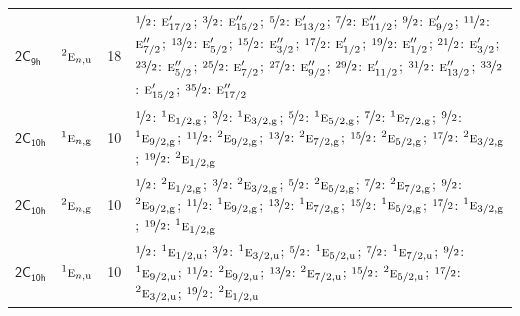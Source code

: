 \documentclass[10pt,a4paper]{article}
\numberwithin{equation}{section}
\newcommand{\grp}[1]{\mathsf{#1}}
\newcommand{\irr}[1]{\text{\normalfont\scshape #1}}
\newcommand{\conjpair}[1]{{}^{#1}}
\newcommand{\ptag}[1]{\mathrm{#1}}
\newlength{\fillwidth}\newlength{\cellwidth}\newlength{\colwidth}
\begin{document}
{\begin{longtable}{@{}llr>{\RaggedRight\arraybackslash}p{\fillwidth}@{}}
\href{2C9h.pdf}{$\grp{2C_{9h}}$} & $\conjpair{2}\irr{e}_{n,\ptag{u}}$ & 18 & $\nicefrac{1}{2}$: $\irr{e}_{17/2}'$; $\nicefrac{3}{2}$: $\irr{e}_{15/2}''$; $\nicefrac{5}{2}$: $\irr{e}_{13/2}'$; $\nicefrac{7}{2}$: $\irr{e}_{11/2}''$; $\nicefrac{9}{2}$: $\irr{e}_{9/2}'$; $\nicefrac{11}{2}$: $\irr{e}_{7/2}''$; $\nicefrac{13}{2}$: $\irr{e}_{5/2}'$; $\nicefrac{15}{2}$: $\irr{e}_{3/2}''$; $\nicefrac{17}{2}$: $\irr{e}_{1/2}'$; $\nicefrac{19}{2}$: $\irr{e}_{1/2}''$; $\nicefrac{21}{2}$: $\irr{e}_{3/2}'$; $\nicefrac{23}{2}$: $\irr{e}_{5/2}''$; $\nicefrac{25}{2}$: $\irr{e}_{7/2}'$; $\nicefrac{27}{2}$: $\irr{e}_{9/2}''$; $\nicefrac{29}{2}$: $\irr{e}_{11/2}'$; $\nicefrac{31}{2}$: $\irr{e}_{13/2}''$; $\nicefrac{33}{2}$: $\irr{e}_{15/2}'$; $\nicefrac{35}{2}$: $\irr{e}_{17/2}''$\\
\href{2C10h.pdf}{$\grp{2C_{10h}}$} & $\conjpair{1}\irr{e}_{n,\ptag{g}}$ & 10 & $\nicefrac{1}{2}$: $\conjpair{1}\irr{e}_{1/2,\ptag{g}}$; $\nicefrac{3}{2}$: $\conjpair{1}\irr{e}_{3/2,\ptag{g}}$; $\nicefrac{5}{2}$: $\conjpair{1}\irr{e}_{5/2,\ptag{g}}$; $\nicefrac{7}{2}$: $\conjpair{1}\irr{e}_{7/2,\ptag{g}}$; $\nicefrac{9}{2}$: $\conjpair{1}\irr{e}_{9/2,\ptag{g}}$; $\nicefrac{11}{2}$: $\conjpair{2}\irr{e}_{9/2,\ptag{g}}$; $\nicefrac{13}{2}$: $\conjpair{2}\irr{e}_{7/2,\ptag{g}}$; $\nicefrac{15}{2}$: $\conjpair{2}\irr{e}_{5/2,\ptag{g}}$; $\nicefrac{17}{2}$: $\conjpair{2}\irr{e}_{3/2,\ptag{g}}$; $\nicefrac{19}{2}$: $\conjpair{2}\irr{e}_{1/2,\ptag{g}}$\\
\href{2C10h.pdf}{$\grp{2C_{10h}}$} & $\conjpair{2}\irr{e}_{n,\ptag{g}}$ & 10 & $\nicefrac{1}{2}$: $\conjpair{2}\irr{e}_{1/2,\ptag{g}}$; $\nicefrac{3}{2}$: $\conjpair{2}\irr{e}_{3/2,\ptag{g}}$; $\nicefrac{5}{2}$: $\conjpair{2}\irr{e}_{5/2,\ptag{g}}$; $\nicefrac{7}{2}$: $\conjpair{2}\irr{e}_{7/2,\ptag{g}}$; $\nicefrac{9}{2}$: $\conjpair{2}\irr{e}_{9/2,\ptag{g}}$; $\nicefrac{11}{2}$: $\conjpair{1}\irr{e}_{9/2,\ptag{g}}$; $\nicefrac{13}{2}$: $\conjpair{1}\irr{e}_{7/2,\ptag{g}}$; $\nicefrac{15}{2}$: $\conjpair{1}\irr{e}_{5/2,\ptag{g}}$; $\nicefrac{17}{2}$: $\conjpair{1}\irr{e}_{3/2,\ptag{g}}$; $\nicefrac{19}{2}$: $\conjpair{1}\irr{e}_{1/2,\ptag{g}}$\\
\href{2C10h.pdf}{$\grp{2C_{10h}}$} & $\conjpair{1}\irr{e}_{n,\ptag{u}}$ & 10 & $\nicefrac{1}{2}$: $\conjpair{1}\irr{e}_{1/2,\ptag{u}}$; $\nicefrac{3}{2}$: $\conjpair{1}\irr{e}_{3/2,\ptag{u}}$; $\nicefrac{5}{2}$: $\conjpair{1}\irr{e}_{5/2,\ptag{u}}$; $\nicefrac{7}{2}$: $\conjpair{1}\irr{e}_{7/2,\ptag{u}}$; $\nicefrac{9}{2}$: $\conjpair{1}\irr{e}_{9/2,\ptag{u}}$; $\nicefrac{11}{2}$: $\conjpair{2}\irr{e}_{9/2,\ptag{u}}$; $\nicefrac{13}{2}$: $\conjpair{2}\irr{e}_{7/2,\ptag{u}}$; $\nicefrac{15}{2}$: $\conjpair{2}\irr{e}_{5/2,\ptag{u}}$; $\nicefrac{17}{2}$: $\conjpair{2}\irr{e}_{3/2,\ptag{u}}$; $\nicefrac{19}{2}$: $\conjpair{2}\irr{e}_{1/2,\ptag{u}}$\\

\end{longtable}}
\end{document}
